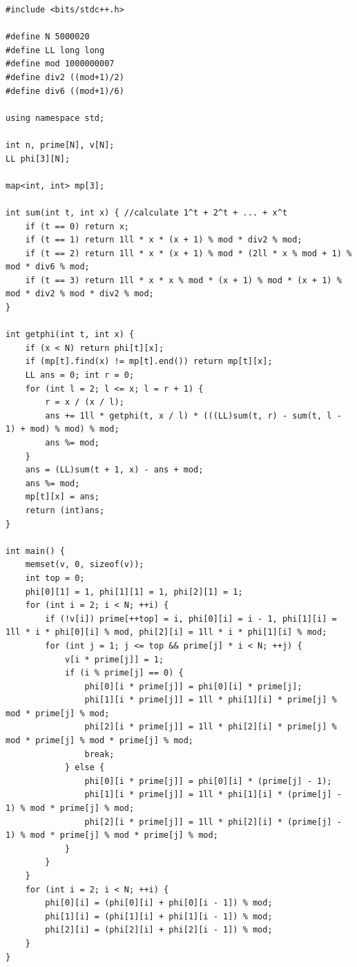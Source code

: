 \documentclass{article}
\begin{document}
\begin{lstlisting}
#include <bits/stdc++.h>
 
#define N 5000020
#define LL long long
#define mod 1000000007
#define div2 ((mod+1)/2)
#define div6 ((mod+1)/6)
 
using namespace std;
 
int n, prime[N], v[N];
LL phi[3][N];
 
map<int, int> mp[3];
 
int sum(int t, int x) { //calculate 1^t + 2^t + ... + x^t
	if (t == 0) return x;
	if (t == 1) return 1ll * x * (x + 1) % mod * div2 % mod;
	if (t == 2) return 1ll * x * (x + 1) % mod * (2ll * x % mod + 1) % mod * div6 % mod;
	if (t == 3) return 1ll * x * x % mod * (x + 1) % mod * (x + 1) % mod * div2 % mod * div2 % mod;
}
 
int getphi(int t, int x) {
	if (x < N) return phi[t][x];
	if (mp[t].find(x) != mp[t].end()) return mp[t][x];
	LL ans = 0; int r = 0;
	for (int l = 2; l <= x; l = r + 1) {
		r = x / (x / l);
		ans += 1ll * getphi(t, x / l) * (((LL)sum(t, r) - sum(t, l - 1) + mod) % mod) % mod;
		ans %= mod;
	}
	ans = (LL)sum(t + 1, x) - ans + mod;
	ans %= mod;
	mp[t][x] = ans;
	return (int)ans;
}
 
int main() {
	memset(v, 0, sizeof(v));
	int top = 0;
	phi[0][1] = 1, phi[1][1] = 1, phi[2][1] = 1;
	for (int i = 2; i < N; ++i) {
		if (!v[i]) prime[++top] = i, phi[0][i] = i - 1, phi[1][i] = 1ll * i * phi[0][i] % mod, phi[2][i] = 1ll * i * phi[1][i] % mod;
		for (int j = 1; j <= top && prime[j] * i < N; ++j) {
			v[i * prime[j]] = 1;
			if (i % prime[j] == 0) {
				phi[0][i * prime[j]] = phi[0][i] * prime[j];
				phi[1][i * prime[j]] = 1ll * phi[1][i] * prime[j] % mod * prime[j] % mod;
				phi[2][i * prime[j]] = 1ll * phi[2][i] * prime[j] % mod * prime[j] % mod * prime[j] % mod;
				break;
			} else {
				phi[0][i * prime[j]] = phi[0][i] * (prime[j] - 1);
				phi[1][i * prime[j]] = 1ll * phi[1][i] * (prime[j] - 1) % mod * prime[j] % mod;
				phi[2][i * prime[j]] = 1ll * phi[2][i] * (prime[j] - 1) % mod * prime[j] % mod * prime[j] % mod;
			}
		}
	}
	for (int i = 2; i < N; ++i) {
		phi[0][i] = (phi[0][i] + phi[0][i - 1]) % mod;
		phi[1][i] = (phi[1][i] + phi[1][i - 1]) % mod;
		phi[2][i] = (phi[2][i] + phi[2][i - 1]) % mod;
	}
}
\end{lstlisting}
\end{document}
